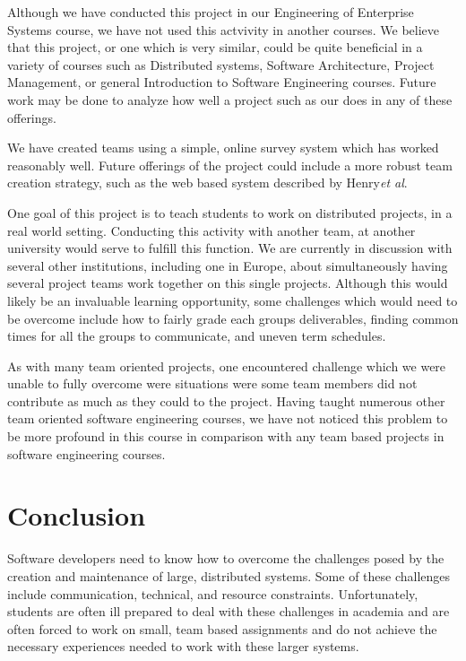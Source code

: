 \documentclass{sig-alternate-05-2015}
\begin{document}
Although we have conducted this project in our Engineering of Enterprise Systems course, we have not used this actvivity in another courses. We believe that this project, or one which is very similar, could be quite beneficial in a variety of courses such as Distributed systems, Software Architecture, Project Management, or general Introduction to Software Engineering courses. Future work may be done to analyze how well a project such as our does in any of these offerings.

We have created teams using a simple, online survey system which has worked reasonably well. Future offerings of the project could include a more robust team creation strategy, such as the web based system described by Henry\emph{et al}\cite{Henry:2013:CES:2445196.2445387}.

One goal of this project is to teach students to work on distributed projects, in a real world setting. Conducting this activity with another team, at another university would serve to fulfill this function. We are currently in discussion with several other institutions, including one in Europe, about simultaneously having several project teams work together on this single projects. Although this would likely be an invaluable learning opportunity, some challenges which would need to be overcome include how to fairly grade each groups deliverables, finding common times for all the groups to communicate, and uneven term schedules.

As with many team oriented projects, one encountered challenge which we were unable to fully overcome were situations were some team members did not contribute as much as they could to the project. Having taught numerous other team oriented software engineering courses, we have not noticed this problem to be more profound in this course in comparison with any team based projects in software engineering courses. 




\section{Conclusion}
\label{sec: conclusion}


Software developers need to know how to overcome the challenges posed by the creation and maintenance of large, distributed systems. Some of these challenges include communication, technical, and resource constraints. Unfortunately, students are often ill prepared to deal with these challenges in academia and are often forced to work on small, team based assignments and do not achieve the necessary experiences needed to work with these larger systems.
\end{document}
